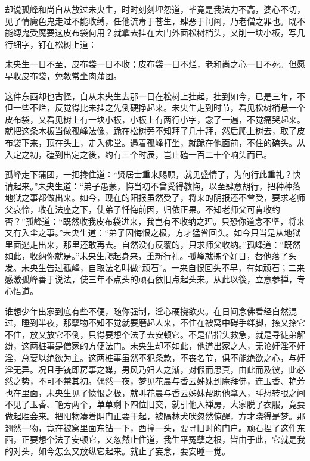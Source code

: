\documentclass[a4paper,12pt,UTF8,twoside]{ctexbook}
\begin{document}
却说孤峰和尚自从放过未央生，时时刻刻埋怨道，毕竟是我法力不高，婆心不切，见了情魔色鬼走过不能收缚，任他流毒于苍生，肆恶于闺阃，乃老僧之罪也。既不能缚鬼受魔要这皮布袋何用？就拿去挂在大门外面松树梢头，又削一块小板，写几行细字，钉在松树上道：

未央生一日不至，皮布袋一日不收；皮布袋一日不烂，老和尚之心一日不死。但愿早收皮布袋，免教常坐肉蒲团。

这件东西却也古怪，自从未央生去那一日在松树上挂起，挂到如今，已是三年，不但一些不烂，反觉得比未挂之先倒硬挣起来。未央生走到时节，看见松树梢悬一个皮布袋，又看见树上有一块小板，小板上有两行小字，念了一遍，不觉痛哭起来。就把这条木板当做孤峰法像，跪在松树旁不知拜了几十拜，然后爬上树去，取了皮布袋下来，顶在头上，走入佛堂。遇着孤峰打坐，就跪在他面前，不住的磕头。从入定之初，磕到出定之後，约有三个时辰，岂止磕一百二十个响头而已。

孤峰走下蒲团，一把搀住道：“贤居士重来赐顾，就见盛情了，为何行此重礼？快请起来。”未央生道：“弟子愚蒙，悔当初不曾受得教悔，以至肆意胡行，把种种落地狱之事都做出来。如今，现在的阳报虽然受了，将来的阴报还不曾受，要求老师父哀怜，收在法座之下，使弟子忏悔前因，归依正果。不知老师父可肯收约否？”孤峰道：“既然收我皮布袋进来，我岂有不收纳之理。只恐你道念不坚，将来又有入尘之事。”未央生道：“弟子因悔恨之极，方才猛省回头。如今只当是从地狱里面逃走出来，那里还敢再去。自然没有反覆的，只求师父收纳。”孤峰道：“既然如此，收纳你就是。”未央生爬起身来，重新行礼。孤峰就拣个好日，替他落了头发。未央生告过孤峰，自取法名叫做“顽石”。一来自恨回头不早，有如顽石；二来感激孤峰善于说法，使三年不点头的顽石依旧点起头来。从此以後，立意参禅，专心悟道。

谁想少年出家到底有些不便，随你强制，淫心硬挠欲火。在日间念佛看经自然混过，睡到半夜，那孽物不知不觉就要磨起人来，不住在被窝中碍手绊脚，捺又捺它不住，放又放它不倒，只得要想个法子去安顿它。不是借指头救急，就是寻徒弟解纷，这两桩事是僧家的方便法门。未央生却不如此，他道出家之人，无论奸淫不奸淫，总要以绝欲为主。这两桩事虽然不犯条款，不丧名节，俱不能绝欲之心，与奸淫无异。况且手铳即房事之媒，男风乃妇人之渐，对假而思真，由此而及彼，此必然之势，不可不禁其初。偶然一夜，梦见花晨与香云姊妹到庵拜佛，连玉香、艳芳也在里面，未央生见了愤恨之极，就叫花晨与香云姊妹帮助他拿入，睡想转眼之间不见了玉香、艳芳两个，单单剩下四位旧交，就引他入禅房，大家脱了衣服，竟要做起胜会来。把阳物凑着阴门正要干起，被隔林犬吠忽然惊醒，方才晓得是梦。那翘然一物，竟在被窝里面东钻一下，西撞一头，要寻旧时的门户。顽石捏了这件东西，正要想个法子安顿它，又忽然止住道，我生平冤孽之根，皆由于此，它就是我的对头，如今怎么又放纵它起来。就止了妄念，要安睡一觉。
\end{document}
